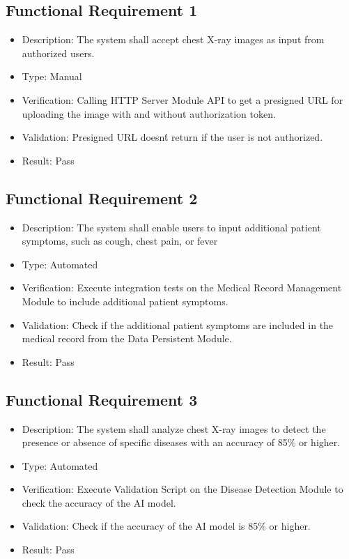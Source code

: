 \documentclass[12pt, titlepage]{article}
\begin{document}
\subsection{Functional Requirement 1}
\begin{itemize}
  \item Description: The system shall accept chest X-ray images as input from authorized users.
  \item Type: Manual
  \item Verification: Calling HTTP Server Module API to get a presigned URL for uploading the image with and without authorization token.
  \item Validation: Presigned URL doesn\'t return if the user is not authorized.
  \item Result: Pass
\end{itemize}

\subsection{Functional Requirement 2}
\begin{itemize}
  \item Description: The system shall enable users to input additional patient symptoms, such as cough, chest pain, or fever
  \item Type: Automated
  \item Verification: Execute integration tests on the Medical Record Management Module to include additional patient symptoms.
  \item Validation: Check if the additional patient symptoms are included in the medical record from the Data Persistent Module.
  \item Result: Pass
\end{itemize}

\subsection{Functional Requirement 3}
\begin{itemize}  
  \item Description: The system shall analyze chest X-ray images to detect the presence or absence of specific diseases with an accuracy of 85\% or higher.
  \item Type: Automated
  \item Verification: Execute Validation Script on the Disease Detection Module to check the accuracy of the AI model.
  \item Validation: Check if the accuracy of the AI model is 85\% or higher.
  \item Result: Pass
\end{itemize}
\end{document}
